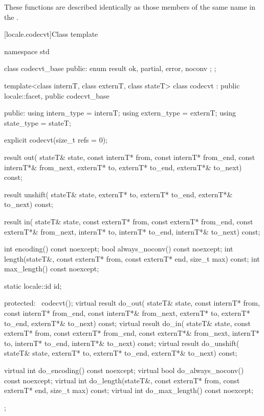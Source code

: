 \pnum
These functions are described identically as those members of the
same name in the
.

[locale.codecvt]{Class template }

%
\begin{codeblock}
namespace std {
  class codecvt_base {
  public:
    enum result { ok, partial, error, noconv };
  };

  template<class internT, class externT, class stateT>
    class codecvt : public locale::facet, public codecvt_base {
    public:
      using intern_type = internT;
      using extern_type = externT;
      using state_type  = stateT;

      explicit codecvt(size_t refs = 0);

      result out(
          stateT& state,
          const internT* from, const internT* from_end, const internT*& from_next,
                externT*   to,       externT*   to_end,       externT*&   to_next) const;

      result unshift(
          stateT& state,
                externT*    to,      externT*   to_end,       externT*&   to_next) const;

      result in(
          stateT& state,
          const externT* from, const externT* from_end, const externT*& from_next,
                internT*   to,       internT*   to_end,       internT*&   to_next) const;

      int encoding() const noexcept;
      bool always_noconv() const noexcept;
      int length(stateT&, const externT* from, const externT* end, size_t max) const;
      int max_length() const noexcept;

      static locale::id id;

    protected:
      ~codecvt();
      virtual result do_out(
          stateT& state,
          const internT* from, const internT* from_end, const internT*& from_next,
                externT* to,         externT*   to_end,       externT*&   to_next) const;
      virtual result do_in(
          stateT& state,
          const externT* from, const externT* from_end, const externT*& from_next,
                internT* to,         internT*   to_end,       internT*&   to_next) const;
      virtual result do_unshift(
          stateT& state,
                externT* to,         externT*   to_end,       externT*&   to_next) const;

      virtual int do_encoding() const noexcept;
      virtual bool do_always_noconv() const noexcept;
      virtual int do_length(stateT&, const externT* from, const externT* end, size_t max) const;
      virtual int do_max_length() const noexcept;
    };
}
\end{codeblock}


